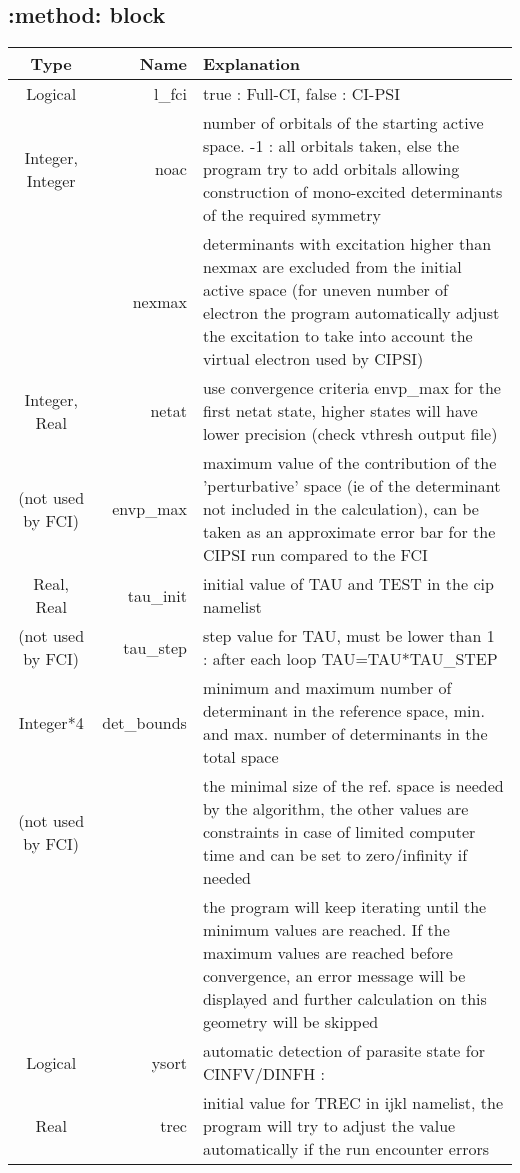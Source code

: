 \documentclass[a4paper,10pt]{article}
\begin{document}
\subsection{:method: block}

\begin{tabular}{|crp{110mm}|}         \hline
\bf{Type} & \bf{Name} & \hspace{4cm}\bf{Explanation}\\ \hline
Logical & l\_fci & true : Full-CI, false : CI-PSI\\\hline
Integer, Integer & noac & number of orbitals of the starting active space. -1 : all orbitals taken, else the program try to add orbitals allowing construction of mono-excited determinants of the required symmetry \\ 
 & nexmax & determinants with excitation higher than nexmax are excluded from the initial active space (for uneven number of electron the program automatically adjust the excitation to take into account the virtual electron used by CIPSI)\\ \hline
Integer, Real & netat & use convergence criteria envp\_max for the first netat state, higher states will have lower precision (check vthresh output file) \\ 
(not used by FCI)& envp\_max & maximum value of the contribution of the 'perturbative' space (ie of the determinant not included in the calculation), can be taken as an approximate error bar for the CIPSI run compared to the FCI\\ \hline
 Real, Real & tau\_init & initial value of TAU and TEST in the cip namelist\\ 
 (not used by FCI) & tau\_step & step value for TAU, must be lower than 1 : after each loop TAU=TAU*TAU\_STEP\\ \hline
Integer*4 & det\_bounds & minimum and maximum number of determinant in the reference space, min. and max. number of determinants in the total space \\ (not used by FCI) & & the minimal size of the ref. space is needed by the algorithm, the other values are constraints in case of limited computer time and can be set to zero/infinity if needed  \\ & & the program will keep iterating until the minimum values are reached. If the maximum values are reached before convergence, an error message will be displayed and further calculation on this geometry will be skipped \\ \hline
Logical & ysort & automatic detection of parasite state for CINFV/DINFH : \\ \hline
Real & trec & initial value for TREC in ijkl namelist, the program will try to adjust the value automatically if the run encounter errors\\ \hline
\end{tabular}
\end{document}

